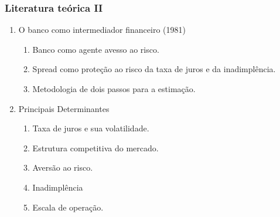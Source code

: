 \documentclass{beamer}
\begin{document}
\begin{frame}
    \frametitle{Literatura teórica II}
    \begin{enumerate}
        \item O banco como intermediador financeiro (1981)
            \begin{enumerate}
                \item Banco como agente avesso ao risco.
                \item Spread como proteção ao risco da taxa de juros e da inadimplência.
                \item Metodologia de dois passos para a estimação.
            \end{enumerate}
        \item Principais Determinantes
            \begin{enumerate}
                \item Taxa de juros e sua volatilidade.
                \item Estrutura competitiva do mercado.
                \item Aversão ao risco.
                \item Inadimplência
                \item Escala de operação.
            \end{enumerate}
    \end{enumerate}

\end{frame}
\end{document}
